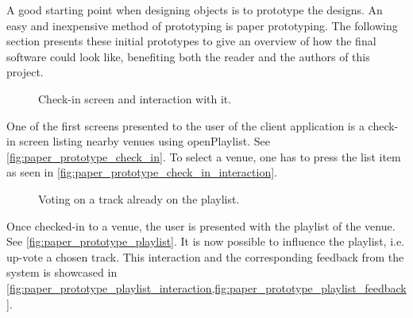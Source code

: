 \label{paper_prototype} 
A good starting point when designing objects is to prototype the
designs. An easy and inexpensive method of prototyping is paper
prototyping. The following section presents these initial prototypes
to give an overview of how the final software could look like,
benefiting both the reader and the authors of this project.

\begin{figure}[H]
  \centering
  \caption{Check-in screen and interaction with it.}
\end{figure}

One of the first screens presented to the user of the client
application is a check-in screen listing nearby venues using
openPlaylist. See \cref{fig:paper_prototype_check_in}. To select a
venue, one has to press the list item as seen in \cref{fig:paper_prototype_check_in_interaction}.

\begin{figure}[H]
  \centering
  \caption{Voting on a track already on the playlist.}
\end{figure}

Once checked-in to a venue, the user is presented with the playlist of
the venue. See \cref{fig:paper_prototype_playlist}. It is now possible
to influence the playlist, i.e. up-vote a chosen track. This
interaction and the corresponding feedback from the system is showcased in
\cref{fig:paper_prototype_playlist_interaction,fig:paper_prototype_playlist_feedback}.

